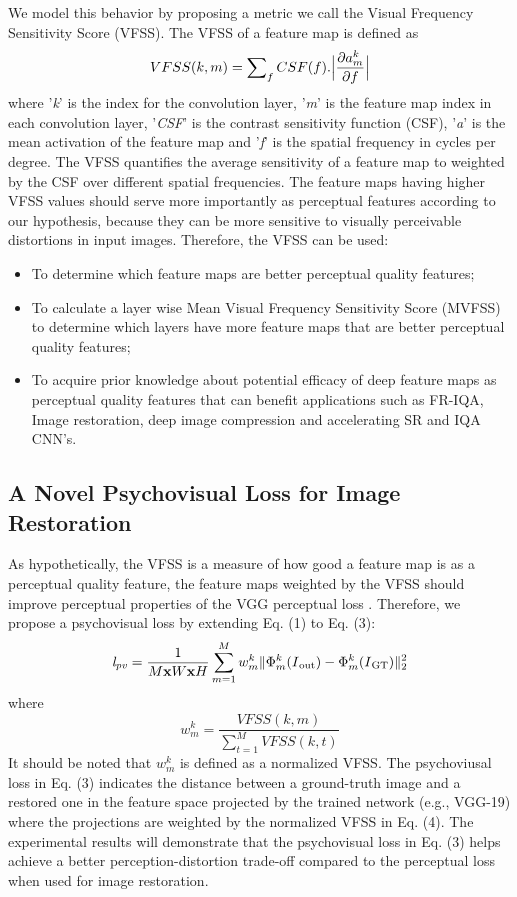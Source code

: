 \documentclass[10pt,twocolumn,letterpaper]{article}
\begin{document}
  We model this behavior by proposing a metric we call the Visual Frequency Sensitivity Score (VFSS). The VFSS of a feature map is defined as
\begin{equation}
VFSS(k,m)=\sum\nolimits_{f}CSF(f).\abs\Big{\frac{\partial a_m^k}{\partial f}}
\end{equation}
where '\textit{k}' is the index for the convolution layer, '\textit{m}' is the feature map index in each convolution layer, '\textit{CSF}' is the contrast sensitivity function (CSF), '\textit{a}' is the mean activation of the feature map and '\textit{f}' is the spatial frequency in cycles per degree.
The VFSS quantifies the average sensitivity of a feature map to weighted by the CSF over different spatial frequencies. The feature maps having higher VFSS values should serve more importantly as perceptual features according to our hypothesis, because they can be more sensitive to visually perceivable distortions in input images. Therefore, the VFSS can be used:
\begin{itemize}
 \item To determine which feature maps are better perceptual quality features;
 \item To calculate a layer wise Mean Visual Frequency Sensitivity Score (MVFSS) to determine which layers have more feature maps that are better perceptual quality features;
 \item To acquire prior knowledge about potential efficacy of deep feature maps as perceptual quality features that can benefit applications such as FR-IQA, Image restoration, deep image compression and accelerating SR and IQA CNN's.
\end{itemize}

\subsection{A Novel Psychovisual Loss for Image Restoration}
As hypothetically, the VFSS is a measure of how good a feature map is as a perceptual quality feature, the feature maps weighted by the VFSS should improve perceptual properties of the VGG perceptual loss \cite{7}. Therefore, we propose a psychovisual loss by extending Eq. (1) to  Eq. (3):
\begin{equation}
\mathit{l_{pv}}=\frac{1}{M\mathbf{x} W\mathbf{x} H}\sum\limits_{m=1}^M w_m^k\Vert\Phi_m^k(I\textsubscript{out})-\Phi_m^k(I\textsubscript{GT})\Vert_2^2
\end{equation}
where
\begin{equation}
   w_m^k=\frac{VFSS(k,m)}{{\sum\limits_{t=1}^M VFSS(k,t)}}
\end{equation}
It should be noted that $w^k_m$ is defined as a normalized VFSS. The psychoviusal loss in Eq. (3) indicates the distance between a ground-truth image and a restored one in the feature space projected by the trained network (e.g., VGG-19) where the projections are weighted by the normalized VFSS in Eq. (4). The experimental results will demonstrate that the psychovisual loss in Eq. (3) helps achieve a better perception-distortion trade-off compared to the perceptual loss when used for image restoration.
\end{document}
